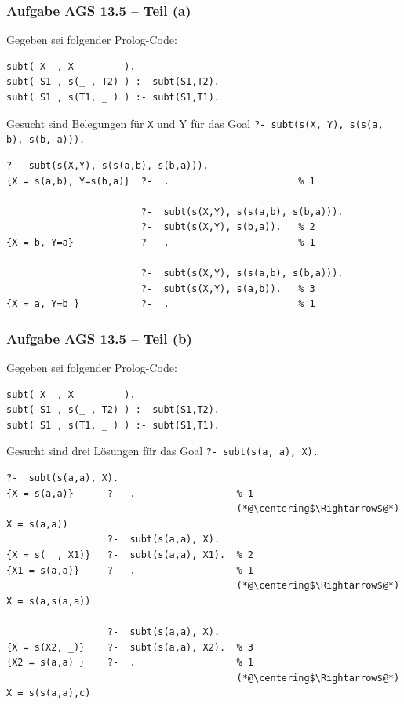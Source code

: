 \documentclass{beamer}
\begin{document}

\begin{frame}[fragile] \frametitle{Aufgabe AGS 13.5 -- Teil (a)}
	\footnotesize
	\textcolor{cdblue}{Gegeben} sei folgender Prolog-Code:
	\begin{lstlisting}
subt( X  , X         ). 
subt( S1 , s(_ , T2) ) :- subt(S1,T2).
subt( S1 , s(T1, _ ) ) :- subt(S1,T1).
	\end{lstlisting}
	\textcolor{cdblue}{Gesucht} sind Belegungen für \texttt{X} und {Y} für das Goal \texttt{?- subt(s(X, Y), s(s(a, b), s(b, a))).}
	\pause
	
	\begin{lstlisting}[style=refutation, basicstyle=\ttfamily\scriptsize]
                        ?-  subt(s(X,Y), s(s(a,b), s(b,a))). 
{X = s(a,b), Y=s(b,a)}  ?-  .                       % 1  

                        ?-  subt(s(X,Y), s(s(a,b), s(b,a))).
                        ?-  subt(s(X,Y), s(b,a)).   % 2
{X = b, Y=a}            ?-  .                       % 1

                        ?-  subt(s(X,Y), s(s(a,b), s(b,a))).
                        ?-  subt(s(X,Y), s(a,b)).   % 3
{X = a, Y=b }           ?-  .                       % 1
	\end{lstlisting}
\end{frame}

\begin{frame}[fragile] \frametitle{Aufgabe AGS 13.5 -- Teil (b)}
	\footnotesize
	\textcolor{cdblue}{Gegeben}  sei folgender Prolog-Code:
	\begin{lstlisting}
subt( X  , X         ). 
subt( S1 , s(_ , T2) ) :- subt(S1,T2).
subt( S1 , s(T1, _ ) ) :- subt(S1,T1).
	\end{lstlisting}
	\textcolor{cdblue}{Gesucht} sind drei Lösungen für das Goal \texttt{?- subt(s(a, a), X).} 
	\pause

	\begin{lstlisting}[style=refutation, basicstyle=\ttfamily\scriptsize]
                  ?-  subt(s(a,a), X). 
{X = s(a,a)}      ?-  .                  % 1
                                         (*@\centering$\Rightarrow$@*) X = s(a,a))
                  ?-  subt(s(a,a), X). 
{X = s(_ , X1)}   ?-  subt(s(a,a), X1).  % 2 
{X1 = s(a,a)}     ?-  .                  % 1 
                                         (*@\centering$\Rightarrow$@*) X = s(a,s(a,a))

                  ?-  subt(s(a,a), X). 
{X = s(X2, _)}    ?-  subt(s(a,a), X2).  % 3 
{X2 = s(a,a) }    ?-  .                  % 1 
                                         (*@\centering$\Rightarrow$@*) X = s(s(a,a),c)
	\end{lstlisting}
\end{frame}
\end{document}
